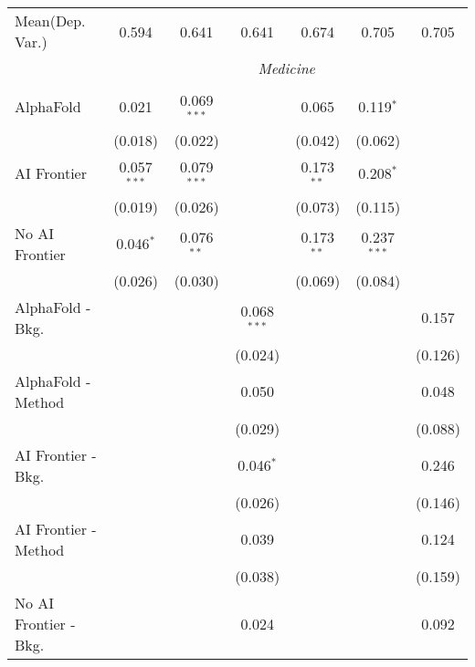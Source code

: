 \begin{tabular}{lcccccc}
Mean(Dep. Var.) & 0.594 & 0.641 & 0.641 & 0.674 & 0.705 & 0.705 \\
 & \multicolumn{6}{c}{\textit{Medicine}} \\ \\
   AlphaFold               & 0.021         & 0.069$^{***}$ &               & 0.065        & 0.119$^{*}$   &   \\   
                           & (0.018)       & (0.022)       &               & (0.042)      & (0.062)       &   \\   
   AI Frontier             & 0.057$^{***}$ & 0.079$^{***}$ &               & 0.173$^{**}$ & 0.208$^{*}$   &   \\   
                           & (0.019)       & (0.026)       &               & (0.073)      & (0.115)       &   \\   
   No AI Frontier          & 0.046$^{*}$   & 0.076$^{**}$  &               & 0.173$^{**}$ & 0.237$^{***}$ &   \\   
                           & (0.026)       & (0.030)       &               & (0.069)      & (0.084)       &   \\   
   AlphaFold - Bkg.        &               &               & 0.068$^{***}$ &              &               & 0.157\\   
                           &               &               & (0.024)       &              &               & (0.126)\\   
   AlphaFold - Method      &               &               & 0.050         &              &               & 0.048\\   
                           &               &               & (0.029)       &              &               & (0.088)\\   
   AI Frontier - Bkg.      &               &               & 0.046$^{*}$   &              &               & 0.246\\   
                           &               &               & (0.026)       &              &               & (0.146)\\   
   AI Frontier - Method    &               &               & 0.039         &              &               & 0.124\\   
                           &               &               & (0.038)       &              &               & (0.159)\\   
   No AI Frontier - Bkg.   &               &               & 0.024         &              &               & 0.092\\   

\end{tabular}
